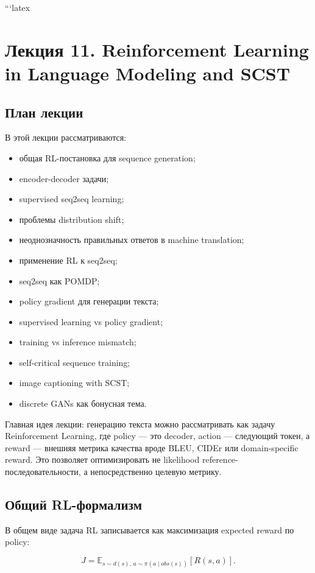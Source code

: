 \documentclass[a4paper,12pt]{article}
\begin{document}
```latex
\section{Лекция 11. Reinforcement Learning in Language Modeling and SCST}

\subsection{План лекции}

В этой лекции рассматриваются:

\begin{itemize}
    \item общая RL-постановка для sequence generation;
    \item encoder-decoder задачи;
    \item supervised seq2seq learning;
    \item проблемы distribution shift;
    \item неоднозначность правильных ответов в machine translation;
    \item применение RL к seq2seq;
    \item seq2seq как POMDP;
    \item policy gradient для генерации текста;
    \item supervised learning vs policy gradient;
    \item training vs inference mismatch;
    \item self-critical sequence training;
    \item image captioning with SCST;
    \item discrete GANs как бонусная тема.
\end{itemize}

Главная идея лекции: генерацию текста можно рассматривать как задачу Reinforcement Learning, где policy --- это decoder, action --- следующий токен, а reward --- внешняя метрика качества вроде BLEU, CIDEr или domain-specific reward. Это позволяет оптимизировать не likelihood reference-последовательности, а непосредственно целевую метрику.

\subsection{Общий RL-формализм}

В общем виде задача RL записывается как максимизация expected reward по policy:

\[
J
=
\mathbb{E}_{s \sim d(s), \, a \sim \pi(a \mid obs(s))}
[
R(s,a)
].
\]
\end{document}
